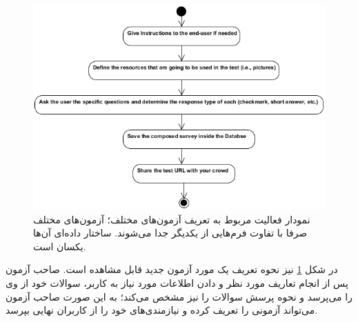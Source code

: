 \begin{figure}
	\centering\includegraphics[width=0.7\linewidth]{Resources/DefineActivityDiagram.PNG}
	\caption[نمودار فعالیت مربوط به تعریف آزمون‌های مختلف]{
		نمودار فعالیت مربوط به تعریف آزمون‌های مختلف؛ آزمون‌های مختلف صرفا با تفاوت فرم‌هایی از یکدیگر جدا می‌شوند. ساختار داده‌ای آن‌ها یکسان است.
	}
	\label{fig:defactivity}
\end{figure}
در شکل
\ref{fig:defactivity}
نیز نحوه تعریف یک مورد آزمون جدید قابل مشاهده است. صاحب آزمون پس از انجام تعاریف مورد نظر و دادن اطلاعات مورد نیاز به کاربر، سوالات خود از وی را می‌پرسد و نحوه پرسش سوالات را نیز مشخص می‌کند؛ به این صورت صاحب آزمون می‌تواند آزمونی را تعریف کرده و نیازمندی‌های خود را از کاربران نهایی بپرسد.
